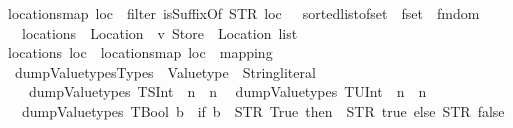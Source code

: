 \begin{isabellebody}
{\isachardoublequoteopen}locations{\isacharunderscore}{\kern0pt}map\ loc\ {\isacharequal}{\kern0pt}\ {\isacharparenleft}{\kern0pt}filter\ {\isacharparenleft}{\kern0pt}isSuffixOf\ {\isacharparenleft}{\kern0pt}{\isacharparenleft}{\kern0pt}STR\ {\isacharprime}{\kern0pt}{\isacharprime}{\kern0pt}{\isachardot}{\kern0pt}{\isacharprime}{\kern0pt}{\isacharprime}{\kern0pt}{\isacharparenright}{\kern0pt}{\isacharplus}{\kern0pt}loc{\isacharparenright}{\kern0pt}{\isacharparenright}{\kern0pt}{\isacharparenright}{\kern0pt}\ {\isasymcirc}\ \ sorted{\isacharunderscore}{\kern0pt}list{\isacharunderscore}{\kern0pt}of{\isacharunderscore}{\kern0pt}set{\isacharprime}{\kern0pt}\ {\isasymcirc}\ fset\ {\isasymcirc}\ fmdom{\isachardoublequoteclose}\isanewline
\isanewline
{}\isamarkupfalse%
\ \ locations\ {\isacharcolon}{\kern0pt}{\isacharcolon}{\kern0pt}\ {\isachardoublequoteopen}Location\ {\isasymRightarrow}\ {\isacharprime}{\kern0pt}v\ Store\ {\isasymRightarrow}\ Location\ list{\isachardoublequoteclose}\ \isanewline
{\isachardoublequoteopen}locations\ loc\ {\isacharequal}{\kern0pt}\ locations{\isacharunderscore}{\kern0pt}map\ loc\ {\isasymcirc}\ mapping{\isachardoublequoteclose}%
\isadelimdocument
%
\endisadelimdocument
%
\isatagdocument
%
\isamarkuptrue%
%
\endisatagdocument
{\isafolddocument}%
%
\isadelimdocument
%
\endisadelimdocument
{}\isamarkupfalse%
\ dump\isactrlsub V\isactrlsub a\isactrlsub l\isactrlsub u\isactrlsub e\isactrlsub t\isactrlsub y\isactrlsub p\isactrlsub e\isactrlsub s{\isacharcolon}{\kern0pt}{\isacharcolon}{\kern0pt}{\isachardoublequoteopen}Types\ {\isasymRightarrow}\ Valuetype\ {\isasymRightarrow}\ String{\isachardot}{\kern0pt}literal{\isachardoublequoteclose}\ \isanewline
\ \ \ {\isachardoublequoteopen}dump\isactrlsub V\isactrlsub a\isactrlsub l\isactrlsub u\isactrlsub e\isactrlsub t\isactrlsub y\isactrlsub p\isactrlsub e\isactrlsub s\ {\isacharparenleft}{\kern0pt}TSInt\ {\isacharunderscore}{\kern0pt}{\isacharparenright}{\kern0pt}\ n\ {\isacharequal}{\kern0pt}\ n{\isachardoublequoteclose}\isanewline
\ {\isacharbar}{\kern0pt}\ {\isachardoublequoteopen}dump\isactrlsub V\isactrlsub a\isactrlsub l\isactrlsub u\isactrlsub e\isactrlsub t\isactrlsub y\isactrlsub p\isactrlsub e\isactrlsub s\ {\isacharparenleft}{\kern0pt}TUInt\ {\isacharunderscore}{\kern0pt}{\isacharparenright}{\kern0pt}\ n\ {\isacharequal}{\kern0pt}\ n{\isachardoublequoteclose}\isanewline
\ {\isacharbar}{\kern0pt}\ {\isachardoublequoteopen}dump\isactrlsub V\isactrlsub a\isactrlsub l\isactrlsub u\isactrlsub e\isactrlsub t\isactrlsub y\isactrlsub p\isactrlsub e\isactrlsub s\ TBool\ b\ {\isacharequal}{\kern0pt}\ {\isacharparenleft}{\kern0pt}if\ b\ {\isacharequal}{\kern0pt}\ {\isacharparenleft}{\kern0pt}STR\ {\isacharprime}{\kern0pt}{\isacharprime}{\kern0pt}True{\isacharprime}{\kern0pt}{\isacharprime}{\kern0pt}{\isacharparenright}{\kern0pt}\ then\ \ STR\ {\isacharprime}{\kern0pt}{\isacharprime}{\kern0pt}true{\isacharprime}{\kern0pt}{\isacharprime}{\kern0pt}\ else\ STR\ {\isacharprime}{\kern0pt}{\isacharprime}{\kern0pt}false{\isacharprime}{\kern0pt}{\isacharprime}{\kern0pt}{\isacharparenright}{\kern0pt}{\isachardoublequoteclose}\isanewline

\end{isabellebody}
